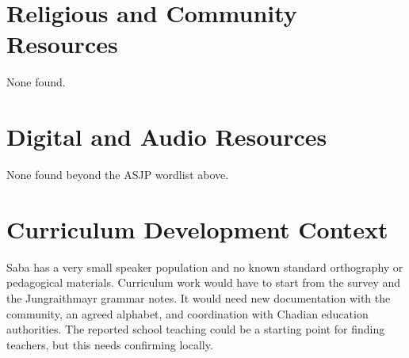 \documentclass[12pt]{article}
\begin{document}
\section{Religious and Community Resources}
None found.

\section{Digital and Audio Resources}
None found beyond the ASJP wordlist above.

\section{Curriculum Development Context}
Saba has a very small speaker population and no known standard orthography or pedagogical materials. Curriculum work would have to start from the survey and the Jungraithmayr grammar notes. It would need new documentation with the community, an agreed alphabet, and coordination with Chadian education authorities. The reported school teaching could be a starting point for finding teachers, but this needs confirming locally.
\end{document}
